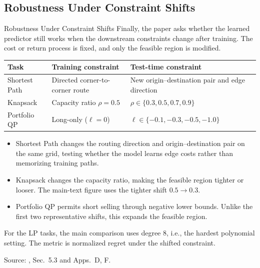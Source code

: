 \subsection{Robustness Under Constraint Shifts}

\begin{frame}{Robustness Under Constraint Shifts}
    Finally, the paper asks whether the learned predictor still works when the downstream constraints change after training. The cost or return process is fixed, and only the feasible region is modified.

    \begin{center}
        {\small
        \setlength{\tabcolsep}{5pt}
        \renewcommand{\arraystretch}{1.30}
        \begin{tabular}{lll}
            \toprule
            Task & Training constraint & Test-time constraint\\
            \midrule
            Shortest Path & Directed corner-to-corner route & New origin--destination pair and edge direction\\
            Knapsack & Capacity ratio $\rho=0.5$ & $\rho\in\{0.3,0.5,0.7,0.9\}$\\
            Portfolio QP & Long-only ($\ell=0$) & $\ell\in\{-0.1,-0.3,-0.5,-1.0\}$\\
            \bottomrule
        \end{tabular}}
    \end{center}

    \begin{itemize}
        \item Shortest Path changes the routing direction and origin--destination pair on the same grid, testing whether the model learns edge costs rather than memorizing training paths.
        \item Knapsack changes the capacity ratio, making the feasible region tighter or looser. The main-text figure uses the tighter shift $0.5\to0.3$.
        \item Portfolio QP permits short selling through negative lower bounds. Unlike the first two representative shifts, this expands the feasible region.
    \end{itemize}

    For the LP tasks, the main comparison uses degree 8, i.e., the hardest polynomial setting. The metric is normalized regret under the shifted constraint.

    \vfill
    {\tiny Source: \citet{lee2026decisionfocusedlearningtangentspaceprojection}, Sec.~5.3 and Apps.~D, F.}
\end{frame}

